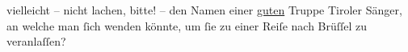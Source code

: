                   vielleicht – nicht lachen, bitte! – den Namen einer \uline{guten}{ } Truppe Tiroler Sänger, \introOben{}an\introOben{} welche man{ }ſich wenden könnte, um{ }ſie zu einer Reiſe
                  nach Brüſſel zu veranlaſſen?\pend
           \endnumbering{}  \newcommand{\dateiname}{L02669}\newcommand{\titel}{Paul Goldmann an Arthur Schnitzler, 27. 10. 1891}\newcommand{\editorInnen}{Martin Anton Müller und Laura Untner}
